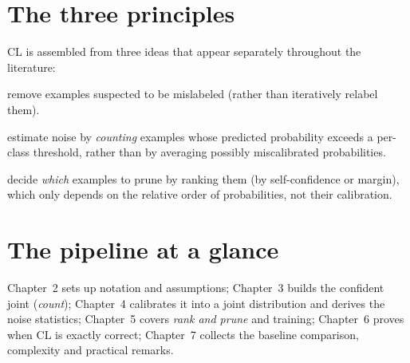\documentclass[11pt,a4paper]{report}
\newcommand{\1}{\mathbf 1}
\theoremstyle{definition}
\theoremstyle{plain}
\theoremstyle{remark}
\begin{document}
\section{The three principles}
CL is assembled from three ideas that appear separately throughout the literature:
\begin{description}[leftmargin=2.4cm,style=nextline]
  \item[Prune] remove examples suspected to be mislabeled (rather than iteratively relabel them).
  \item[Count] estimate noise by \emph{counting} examples whose predicted probability exceeds a per-class threshold, rather than by averaging possibly miscalibrated probabilities.
  \item[Rank] decide \emph{which} examples to prune by ranking them (by self-confidence or margin), which only depends on the relative order of probabilities, not their calibration.
\end{description}

\section{The pipeline at a glance}
\begin{center}
\end{center}
Chapter~2 sets up notation and assumptions; Chapter~3 builds the confident joint (\emph{count}); Chapter~4 calibrates it into a joint distribution and derives the noise statistics; Chapter~5 covers \emph{rank and prune} and training; Chapter~6 proves when CL is exactly correct; Chapter~7 collects the baseline comparison, complexity and practical remarks.
\end{document}
